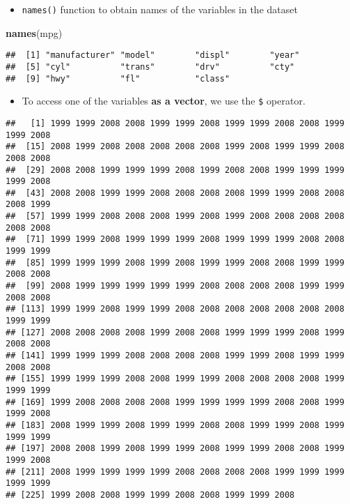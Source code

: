 \documentclass[]{book}
\newenvironment{Shaded}{\begin{snugshade}}{\end{snugshade}}
\newcommand{\KeywordTok}[1]{\textcolor[rgb]{0.13,0.29,0.53}{\textbf{#1}}}
\newcommand{\NormalTok}[1]{#1}
\newcommand{\OperatorTok}[1]{\textcolor[rgb]{0.81,0.36,0.00}{\textbf{#1}}}
\providecommand{\tightlist}{%
  \setlength{\itemsep}{0pt}\setlength{\parskip}{0pt}}
\begin{document}
\begin{itemize}
\tightlist
\item
  \texttt{names()} function to obtain names of the variables in the dataset
\end{itemize}

\begin{Shaded}
\begin{Highlighting}[]
\KeywordTok{names}\NormalTok{(mpg)}
\end{Highlighting}
\end{Shaded}

\begin{verbatim}
##  [1] "manufacturer" "model"        "displ"        "year"        
##  [5] "cyl"          "trans"        "drv"          "cty"         
##  [9] "hwy"          "fl"           "class"
\end{verbatim}

\begin{itemize}
\tightlist
\item
  To access one of the variables \textbf{as a vector}, we use the \texttt{\$} operator.
\end{itemize}

\begin{Shaded}
\end{Shaded}

\begin{verbatim}
##   [1] 1999 1999 2008 2008 1999 1999 2008 1999 1999 2008 2008 1999 1999 2008
##  [15] 2008 1999 2008 2008 2008 2008 2008 1999 2008 1999 1999 2008 2008 2008
##  [29] 2008 2008 1999 1999 1999 2008 1999 2008 2008 1999 1999 1999 1999 2008
##  [43] 2008 2008 1999 1999 2008 2008 2008 2008 1999 1999 2008 2008 2008 1999
##  [57] 1999 1999 2008 2008 2008 1999 2008 1999 2008 2008 2008 2008 2008 2008
##  [71] 1999 1999 2008 1999 1999 1999 2008 1999 1999 1999 2008 2008 1999 1999
##  [85] 1999 1999 1999 2008 1999 2008 1999 1999 2008 2008 1999 1999 2008 2008
##  [99] 2008 1999 1999 1999 1999 1999 2008 2008 2008 2008 1999 1999 2008 2008
## [113] 1999 1999 2008 1999 1999 2008 2008 2008 2008 2008 2008 2008 1999 1999
## [127] 2008 2008 2008 2008 1999 2008 2008 1999 1999 1999 2008 1999 2008 2008
## [141] 1999 1999 1999 2008 2008 2008 2008 1999 1999 2008 1999 1999 2008 2008
## [155] 1999 1999 1999 2008 2008 1999 1999 2008 2008 2008 2008 1999 1999 1999
## [169] 1999 2008 2008 2008 2008 1999 1999 1999 1999 2008 2008 1999 1999 2008
## [183] 2008 1999 1999 2008 1999 1999 2008 2008 1999 1999 2008 1999 1999 1999
## [197] 2008 2008 1999 2008 1999 1999 2008 1999 1999 2008 2008 1999 1999 2008
## [211] 2008 1999 1999 1999 1999 2008 2008 2008 2008 1999 1999 1999 1999 1999
## [225] 1999 2008 2008 1999 1999 2008 2008 1999 1999 2008
\end{verbatim}
\end{document}
